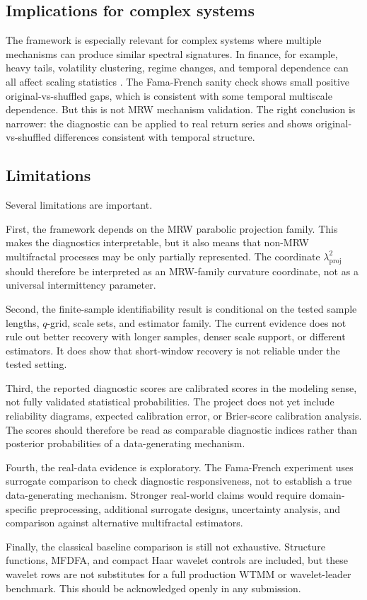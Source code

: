 \subsection{Implications for complex systems}

The framework is especially relevant for complex systems where multiple
mechanisms can produce similar spectral signatures. In finance, for example,
heavy tails, volatility clustering, regime changes, and temporal dependence
can all affect scaling statistics
\cite{cont2001stylized,bouchaud2000apparent,zhou2009components,barunik2012source}.
The Fama-French sanity check shows small positive original-vs-shuffled gaps,
which is consistent with some temporal multiscale dependence. But this is not
MRW mechanism validation. The right conclusion is narrower: the diagnostic can
be applied to real return series and shows original-vs-shuffled differences
consistent with temporal structure.

\subsection{Limitations}

Several limitations are important.

First, the framework depends on the MRW parabolic projection family. This
makes the diagnostics interpretable, but it also means that non-MRW
multifractal processes may be only partially represented. The coordinate
\(\lambda^2_{\mathrm{proj}}\) should therefore be interpreted as an
MRW-family curvature coordinate, not as a universal intermittency parameter.

Second, the finite-sample identifiability result is conditional on the tested
sample lengths, \(q\)-grid, scale sets, and estimator family. The current
evidence does not rule out better recovery with longer samples, denser scale
support, or different estimators. It does show that short-window recovery is
not reliable under the tested setting.

Third, the reported diagnostic scores are calibrated scores in the modeling
sense, not fully validated statistical probabilities. The project does not yet
include reliability diagrams, expected calibration error, or Brier-score
calibration analysis. The scores should therefore be read as comparable
diagnostic indices rather than posterior probabilities of a data-generating
mechanism.

Fourth, the real-data evidence is exploratory. The Fama-French experiment uses
surrogate comparison to check diagnostic responsiveness, not to establish a
true data-generating mechanism. Stronger real-world claims would require
domain-specific preprocessing, additional surrogate designs, uncertainty
analysis, and comparison against alternative multifractal estimators.

Finally, the classical baseline comparison is still not exhaustive. Structure
functions, MFDFA, and compact Haar wavelet controls are included, but these
wavelet rows are not substitutes for a full production WTMM or wavelet-leader
benchmark. This should be acknowledged openly in any submission.
